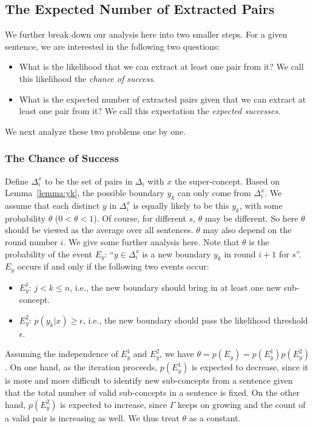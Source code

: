 \documentclass[10pt,journal,cspaper,compsoc]{IEEEtran}
\begin{document}
\subsection{The Expected Number of Extracted Pairs}

We further break down our analysis here into two smaller steps. For a given sentence, we are interested in the following two questions:
\begin{itemize}
    \item What is the likelihood that we can extract at least one pair from it? We call this likelihood the \emph{chance of success}.
    \item What is the expected number of extracted pairs given that we can extract at least one pair from it? We call this expectation the \emph{expected successes}.
\end{itemize}
We next analyze these two problems one by one.

\subsubsection{The Chance of Success}

Define $\Delta_i^x$ to be the set of pairs in $\Delta_i$ with $x$ the super-concept. Based on Lemma~\ref{lemma:yk}, the possible boundary $y_k$ can only come from $\Delta_i^x$. We assume that each distinct $y$ in $\Delta_i^x$ is equally likely to be this $y_k$, with some probability $\theta$ ($0<\theta<1$). Of course, for different $s$, $\theta$ may be different. So here $\theta$ should be viewed as the average over all sentences.
$\theta$ may also depend on the round number $i$. We give some further analysis here. Note that $\theta$ is the probability of the event $E_y$: ``$y\in\Delta_i^x$ is a new boundary $y_k$ in round $i+1$ for $s$''. $E_y$ occurs if and only if the following two events occur:
\begin{itemize}
\item $E_y^1$: $j<k\leq n$, i.e., the new boundary should bring in at least one new sub-concept.
\item $E_y^2$: $p(y_k|x)\geq\epsilon$, i.e., the new boundary should pass the likelihood threshold $\epsilon$.
\end{itemize}
Assuming the independence of $E_y^1$ and $E_y^2$, we have $\theta=p(E_y)=p(E_y^1)p(E_y^2)$. On one hand, as the iteration proceeds, $p(E_y^1)$ is expected to decrease, since it is more and more difficult to identify new sub-concepts from a sentence given that the total number of valid sub-concepts in a sentence is fixed. On the other hand, $p(E_y^2)$ is expected to increase, since $\Gamma$ keeps on growing and the count of a valid pair is increasing as well. We thus treat $\theta$ as a constant.
\end{document}
